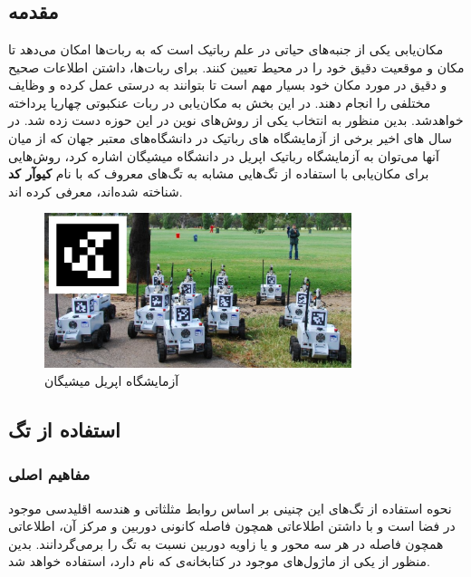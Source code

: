 \newpage
\section{}

\subsection{مقدمه}

مکان‌یابی یکی از جنبه‌های حیاتی در علم رباتیک است که به ربات‌ها امکان می‌دهد تا مکان و موقعیت دقیق خود را در محیط تعیین کنند. برای ربات‌ها، داشتن اطلاعات صحیح و دقیق در مورد مکان خود بسیار مهم است تا بتوانند به درستی عمل کرده و وظایف مختلفی را انجام دهند. در این بخش به مکان‌یابی در ربات عنکبوتی چهارپا پرداخته خواهد‌شد. بدین منظور به انتخاب یکی از روش‌‌‌های نوین در این حوزه دست زده شد. در سال های اخیر برخی از آزمایشگاه های رباتیک در دانشگاه‌‌‌های معتبر جهان که از میان آنها می‌توان به آزمایشگاه رباتیک اپریل
\noindent\unskip{}
در دانشگاه میشیگان اشاره کرد، روش‌هایی برای مکان‌یابی با استفاده از تگ‌هایی مشابه به تگ‌های معروف که با نام 
\textbf{کیوآر کد}
\noindent\unskip{}
شناخته شده‌اند، معرفی کرده اند.

\begin{figure}[H]
	\centering
	\includegraphics[width=0.8\textwidth]{./images/Chapter2/AprilTagLab}	
	\caption[آزمایشگاه اپریل میشیگان]{ آزمایشگاه اپریل میشیگان\cite{Apriltag}}
	\label{AprilTagLab}
\end{figure}
\noindent
\unskip

\newpage
\subsection{استفاده از تگ}
\subsubsection{مفاهیم اصلی}
نحوه استفاده از تگ‌های این چنینی بر اساس روابط مثلثاتی و هندسه اقلیدسی موجود در فضا است و با داشتن اطلاعاتی همچون فاصله کانونی دوربین و مرکز آن، اطلاعاتی همچون فاصله در هر سه محور و یا زاویه دوربین نسبت به تگ را برمی‌گردانند.
بدین منظور از یکی از ماژول‌های موجود در کتابخانه‌ی
که
نام دارد، استفاده خواهد شد. 

